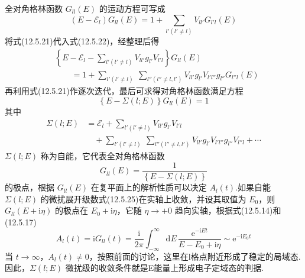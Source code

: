 全对角格林函数 $G_{ll}\left(E\right)$ 的运动方程可写成
\begin{equation}
  \left(E-\mathscr{E}_{l}\right)G_{ll}\left(E\right)=1
  +\sum_{l'\left(l'\neq l\right)}V_{ll'}G_{l'l}\left(E\right)
\end{equation}
将式(12.5.21)代入式(12.5.22)，经整理后得
\begin{equation}
\begin{aligned}
  &\left\{E-\mathscr{E}_{l}-\sum_{l'\left(l'\neq l\right)}V_{ll'}g_{l'}V_{l'l}\right\}G_{ll}\left(E\right)\\
  &\qquad=1+\sum_{l'\left(l'\neq l\right)}\ \sum_{l''\left(l''\neq l,l'\right)}
  V_{ll'}g_{l'}V_{l'l''}g_{l''}G_{l''l}\left(E\right)
\end{aligned}
\end{equation}
再利用式(12.5.21)作逐次迭代，最后可求得对角格林函数满足方程
\begin{equation}
  \left\{E-\Sigma\left(l;E\right)\right\}G_{ll}\left(E\right)=1
\end{equation}
其中
\begin{equation}
\begin{aligned}
  \Sigma\left(l;E\right)&=\mathscr{E}_{l}
  +\sum_{l'\left(l'\neq l\right)}V_{ll'}g_{l'}V_{l'l}\\
  &\quad+\sum_{l'\left(l'\neq l\right)}\ \sum_{l''\left(l''\neq l,l'\right)}
  V_{ll'}g_{l'}V_{l'l''}g_{l''}V_{l''l}+\cdots
\end{aligned}
\end{equation}
$\Sigma\left(l;E\right)$ 称为自能，它代表全对角格林函数
\begin{equation}
  G_{ll}\left(E\right)=\frac{1}{\left\{E-\Sigma\left(l;E\right)\right\}}
\end{equation}
的极点，根据 $G_{ll}\left(E\right)$ 在复平面上的解析性质可以决定 $A_{l}\left(t\right)$.如果自能 $\Sigma\left(l;E\right)$ 的微扰展开级数式(12.5.25)在实轴上收敛，并设其取值为 $E_{0}$，则 $G_{ll}\left(E+\mathrm{i}\eta\right)$ 的极点在 $E_{0}+\mathrm{i}\eta$，它随 $\eta\rightarrow+0$ 趋向实轴，根据式(12.5.14)和(12.5.17)
\begin{equation}
  A_{l}\left(t\right)=\mathrm{i}G_{ll}\left(t\right)=\frac{\mathrm{i}}{2\pi}\int_{-\infty}^{\infty}
  \mathrm{d}E\,\frac{\mathrm{e}^{-\mathrm{i}Et}}{E-E_{0}+\mathrm{i}\eta}
  \sim\mathrm{e}^{-\mathrm{i}E_{0}t}
\end{equation}
当 $t\rightarrow\infty$，$A_{l}\left(t\right)\neq0$，按照前面的讨论，这里在l格点附近形成了稳定的局域态.因此，$\Sigma\left(l;E\right)$ 微扰级的收敛条件就是E能量上形成电子定域态的判据.

